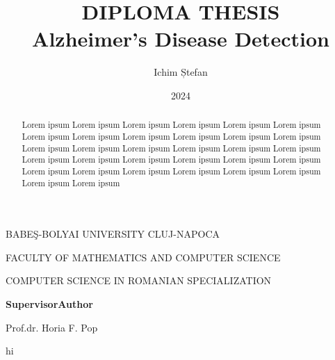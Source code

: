 \documentclass[a4paper, 12pt]{article}
\title{
    DIPLOMA THESIS \\
    Alzheimer's Disease Detection
}
\author{Ichim Ștefan}
\date{2024}
\makeatletter
\renewcommand{\maketitle}{
    \begin{center}
            \normalsize{BABEŞ-BOLYAI UNIVERSITY CLUJ-NAPOCA}\par %
            \normalsize{FACULTY OF MATHEMATICS AND COMPUTER SCIENCE}\par %
            \normalsize{COMPUTER SCIENCE IN ROMANIAN SPECIALIZATION}\par
        \vspace{16em} %

        {\LARGE\@title\par} %
        \vspace{16em} %

        \textbf{Supervisor}\hspace{20em}\textbf{Author}\par
        Prof.dr. Horia F. Pop\hspace{16em}{\large\@author\par} %
        \vspace{3em} %

        {\large\@date\par} %
    \end{center}
}
\makeatother
\begin{document}
\maketitle
\newpage

\begin{abstract}
    Lorem ipsum Lorem ipsum Lorem ipsum Lorem ipsum
    Lorem ipsum Lorem ipsum Lorem ipsum Lorem ipsum
    Lorem ipsum Lorem ipsum Lorem ipsum Lorem ipsum
    Lorem ipsum Lorem ipsum Lorem ipsum Lorem ipsum
    Lorem ipsum Lorem ipsum Lorem ipsum Lorem ipsum
    Lorem ipsum Lorem ipsum Lorem ipsum Lorem ipsum
    Lorem ipsum Lorem ipsum Lorem ipsum Lorem ipsum
    Lorem ipsum Lorem ipsum Lorem ipsum Lorem ipsum
\end{abstract}
\newpage

\tableofcontents
\newpage

hi \cite{example-article, example-book}

\newpage

\end{document}
